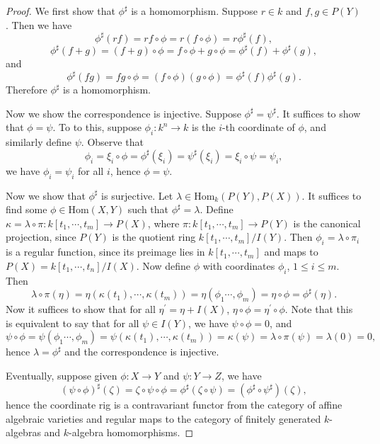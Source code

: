 \begin{proof}
We first show that $\phi^\sharp$ is a homomorphism. Suppose $r\in k$ and $f,g\in P(Y)$. Then we have 
$$
\phi ^{\sharp}\left( rf \right) =rf\circ \phi =r\left( f\circ \phi \right) =r\phi ^{\sharp}\left( f \right) ,
$$
$$
\phi ^{\sharp}\left( f+g \right) =\left( f+g \right) \circ \phi =f\circ \phi +g\circ \phi =\phi ^{\sharp}\left( f \right) +\phi ^{\sharp}\left( g \right) ,
$$
and 
$$
\phi ^{\sharp}\left( fg \right) =fg\circ \phi =\left( f\circ \phi \right) \left( g\circ \phi \right) =\phi ^{\sharp}\left( f \right) \phi ^{\sharp}\left( g \right) .
$$
Therefore $\phi^\sharp$ is a homomorphism.\par
Now we show the correspondence is injective. Suppose $\phi^\sharp=\psi^\sharp$. It suffices to show that $\phi=\psi$. To to this, suppose $\phi_i:k^n\to k$ is the $i$-th coordinate of $\phi$, and similarly define $\psi$. Observe that 
$$
\phi _i=\xi _i\circ \phi =\phi ^{\sharp}\left( \xi _i \right) =\psi ^{\sharp}\left( \xi _i \right) =\xi _i\circ \psi =\psi _i,
$$
we have $\phi_i=\psi_i$ for all $i$, hence $\phi=\psi$.\par
Now we show that $\phi^\sharp$ is surjective. Let $\lambda\in\mathrm{Hom}_k(P(Y),P(X))$. It suffices to find some $\phi\in\mathrm{Hom}(X,Y)$ such that $\phi^\sharp=\lambda$. Define $\kappa=\lambda\circ\pi:k[t_1,\cdots,t_m]\to P(X)$, where $\pi:k[t_1,\cdots,t_m]\to P(Y)$ is the canonical projection, since $P(Y)$ is the quotient ring $k[t_1,\cdots,t_m]/I(Y)$. Then $\phi_i=\lambda\circ\pi_i$ is a regular function, since its preimage lies in $k[t_1,\cdots,t_m]$ and maps to $P(X)=k[t_1,\cdots,t_n]/I(X)$. Now define $\phi$ with coordinates $\phi_i$, $1\le i\le m$. Then 
$$
\lambda \circ \pi \left( \eta \right) =\eta \left( \kappa \left( t_1 \right) ,\cdots ,\kappa \left( t_m \right) \right) =\eta \left( \phi _1\cdots ,\phi _m \right) =\eta \circ \phi =\phi ^{\sharp}\left( \eta \right) .
$$
Now it suffices to show that for all $\eta^\prime=\eta+I(X)$, $\eta\circ\phi=\eta^\prime\circ\phi$. Note that this is equivalent to say that for all $\psi\in I(Y)$, we have $\psi\circ\phi=0$, and 
$$
\psi \circ \phi =\psi \left( \phi _1\cdots ,\phi _m \right) =\psi \left( \kappa \left( t_1 \right) ,\cdots ,\kappa \left( t_m \right) \right) =\kappa \left( \psi \right) =\lambda \circ \pi \left( \psi \right) =\lambda \left( 0 \right) =0,
$$
hence $\lambda=\phi^\sharp$ and the correspondence is injective.\par
Eventually, suppose given $\phi:X\to Y$ and $\psi:Y\to Z$, we have 
$$
\left( \psi \circ \phi \right) ^{\sharp}\left( \zeta \right) =\zeta \circ \psi \circ \phi =\phi ^{\sharp}\left( \zeta \circ \psi \right) =\left( \phi ^{\sharp}\circ \psi ^{\sharp} \right) \left( \zeta \right) ,
$$
hence the coordinate rig is a contravariant functor from the category of affine algebraic varieties and regular maps to the category of finitely generated $k$-algebras and $k$-algebra homomorphisms.
\end{proof}
